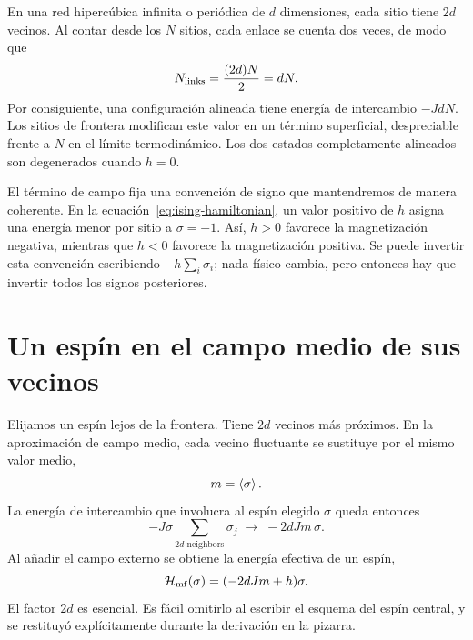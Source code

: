 En una red hipercúbica infinita o periódica de \(d\) dimensiones, cada sitio tiene \(2d\) vecinos. Al contar desde los \(N\) sitios, cada enlace se cuenta dos veces, de modo que
\begin{equation}
N_{\rm links}=\frac{(2d)N}{2}=dN.
\label{eq:number-links}
\end{equation}
Por consiguiente, una configuración alineada tiene energía de intercambio \(-JdN\). Los sitios de frontera modifican este valor en un término superficial, despreciable frente a \(N\) en el límite termodinámico. Los dos estados completamente alineados son degenerados cuando \(h=0\).

El término de campo fija una convención de signo que mantendremos de manera coherente. En la ecuación~\eqref{eq:ising-hamiltonian}, un valor positivo de \(h\) asigna una energía menor por sitio a \(\sigma=-1\). Así, \(h>0\) favorece la magnetización negativa, mientras que \(h<0\) favorece la magnetización positiva. Se puede invertir esta convención escribiendo \(-h\sum_i\sigma_i\); nada físico cambia, pero entonces hay que invertir todos los signos posteriores.

\begin{classroomqa}
\end{classroomqa}

\section{Un espín en el campo medio de sus vecinos}

Elijamos un espín lejos de la frontera. Tiene \(2d\) vecinos más próximos. En la aproximación de campo medio, cada vecino fluctuante se sustituye por el mismo valor medio,
\begin{equation}
m=\left\langle\sigma\right\rangle.
\end{equation}
La energía de intercambio que involucra al espín elegido \(\sigma\) queda entonces
\begin{equation}
-J\sigma\sum_{\text{\(2d\) neighbors}}\sigma_j
\;\longrightarrow\;-2dJm\,\sigma.
\end{equation}
Al añadir el campo externo se obtiene la energía efectiva de un espín,
\begin{equation}
\mathcal H_{\rm mf}(\sigma)=(-2dJm+h)\sigma.
\label{eq:mean-field-one-spin}
\end{equation}
El factor \(2d\) es esencial. Es fácil omitirlo al escribir el esquema del espín central, y se restituyó explícitamente durante la derivación en la pizarra.

